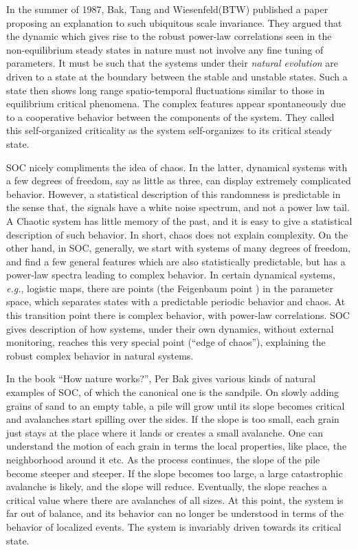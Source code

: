 \documentclass[11pt,a4paper]{book}
\begin{document}
In the summer of 1987, Bak, Tang and Wiesenfeld(BTW) published a paper
\cite{btw}
proposing an explanation to such ubiquitous scale invariance. They argued that the dynamic which gives
rise to the robust power-law correlations seen in the non-equilibrium
steady states in nature must not involve any fine tuning of
parameters. It must be such that the systems under their \textit{natural
evolution} are driven to a state at the boundary between the stable and
unstable states. Such a state then shows long range spatio-temporal
fluctuations similar to those in equilibrium critical phenomena. The
complex features appear spontaneously due to a cooperative behavior
between the components of the system. They called this
self-organized criticality as the system self-organizes to its
critical steady state.

SOC nicely compliments the idea of chaos. In the latter,
dynamical systems with a few degrees of freedom, say as little as
three, can display extremely complicated behavior. However,
a statistical description of this randomness is predictable in the
sense that, the signals have a white noise spectrum, and not a
power law tail. A Chaotic system has little memory of the past, and it
is easy to
give a statistical description of such behavior. In short, chaos does not explain complexity.
On the other hand, in SOC, generally, we start with systems of many
degrees of freedom, and find a few general features which are also
statistically predictable, but has a power-law spectra leading to
complex behavior. In certain dynamical systems, \textit{e.g.},
logistic maps, there are points (the Feigenbaum point \cite{chaos}) in the parameter space, which
separates states with a predictable periodic behavior and chaos. At
this transition point there is complex behavior, with power-law
correlations. SOC gives description of how systems, under their
own dynamics, without external monitoring, reaches this very special
point (``edge of chaos''), explaining the robust complex behavior in natural systems.

In the book ``How nature works?'', Per Bak gives various kinds of
natural examples of SOC, of which the canonical one is the sandpile.
On slowly adding grains of sand to an empty table, a pile will grow
until its slope becomes critical and avalanches start spilling over
the sides. If the slope is too small, each grain just
stays at the place where it lands or creates a small avalanche. One can understand the motion of
each grain in terms the local properties, like place, the neighborhood
around it etc. As the process continues, the slope of the pile become
steeper and steeper. If the slope becomes too large, a large
catastrophic avalanche is likely, and the slope will reduce. Eventually, the slope reaches a critical value
where there are avalanches of all sizes. At this point,
the system is far out of balance, and its behavior can no longer be
understood in terms of the behavior of localized events. The
system is invariably driven towards its critical state.
\end{document}
